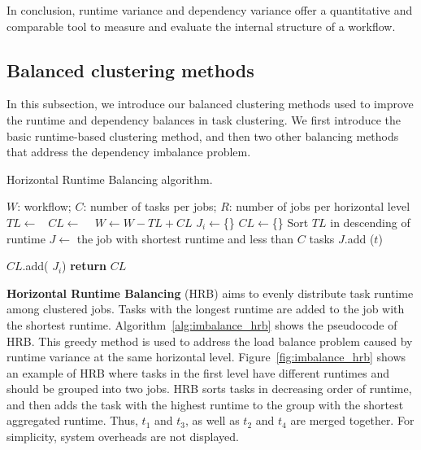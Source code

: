 In conclusion, runtime variance and dependency variance offer a quantitative and comparable tool to measure and evaluate the internal structure of a workflow. 



\subsection{Balanced clustering methods}
\label{sec:methods}
In this subsection, we introduce our balanced clustering methods used to improve the runtime and dependency balances in task clustering. We first introduce the basic runtime-based clustering method, and then two other balancing methods that address the dependency imbalance problem. 

\begin{algorithm}[!htb]
	\footnotesize
	\caption{Horizontal Runtime Balancing algorithm.}
	\label{alg:imbalance_hrb}
	\begin{algorithmic}[1]
		\Require $W$: workflow; $C$: number of tasks per jobs; $R$: number of jobs per horizontal level
				\State $TL\gets $\  
				\State $CL\gets$  \  
				\State $W \gets W - TL + CL$   
			\EndFor
		\EndProcedure
			\State $J_i\gets$\{\}
			\EndFor
			\State $CL\gets$\{\}
			\State Sort $TL$ in descending of runtime
				\State $J\gets$ the job with shortest runtime and less than $C$ tasks  
				\State $J$.add ($t$) 
				
			\EndFor
			\State  $CL$.add( $J_i$)
			\EndFor
			\State \textbf{return} $CL$
		\EndProcedure
	\end{algorithmic}
\end{algorithm}



\textbf{Horizontal Runtime Balancing} (HRB) aims to evenly distribute task runtime among clustered jobs. Tasks with the longest runtime are added to the job with the shortest runtime. Algorithm~\ref{alg:imbalance_hrb} shows the pseudocode of HRB. This greedy method is used to address the load balance problem caused by runtime variance at the same horizontal level. Figure~\ref{fig:imbalance_hrb} shows an example of HRB where tasks in the first level have different runtimes and should be grouped into two jobs. HRB sorts tasks in decreasing order of runtime, and then adds the task with the highest runtime to the group with the shortest aggregated runtime. Thus, $t_1$ and $t_3$, as well as $t_2$ and $t_4$ are merged together.
For simplicity, system overheads are not displayed.

